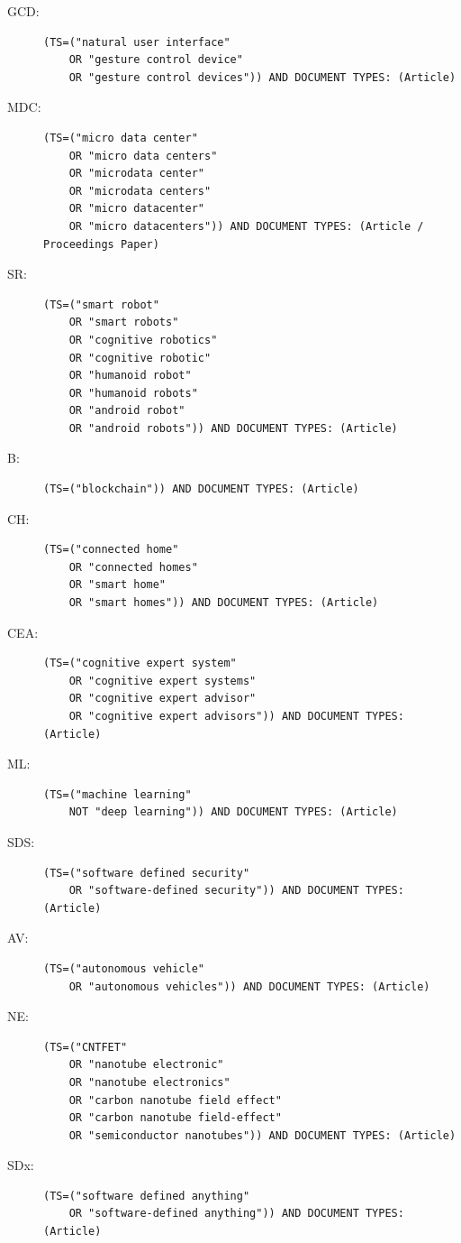 \begin{description}
	\item[GCD:] \begin{verbatim}(TS=("natural user interface"
	OR "gesture control device"
	OR "gesture control devices")) AND DOCUMENT TYPES: (Article)\end{verbatim}
	\item[MDC:] \begin{verbatim}(TS=("micro data center"
	OR "micro data centers"
	OR "microdata center"
	OR "microdata centers"
	OR "micro datacenter"
	OR "micro datacenters")) AND DOCUMENT TYPES: (Article / Proceedings Paper)\end{verbatim}
	\item[SR:] \begin{verbatim}(TS=("smart robot"
	OR "smart robots"
	OR "cognitive robotics"
	OR "cognitive robotic"
	OR "humanoid robot"
	OR "humanoid robots"
	OR "android robot"
	OR "android robots")) AND DOCUMENT TYPES: (Article) \end{verbatim}
	\item[B:] \begin{verbatim}(TS=("blockchain")) AND DOCUMENT TYPES: (Article)\end{verbatim}
	\item[CH:] \begin{verbatim}(TS=("connected home"
	OR "connected homes"
	OR "smart home"
	OR "smart homes")) AND DOCUMENT TYPES: (Article)\end{verbatim}
	\item[CEA:] \begin{verbatim}(TS=("cognitive expert system"
	OR "cognitive expert systems"
	OR "cognitive expert advisor"
	OR "cognitive expert advisors")) AND DOCUMENT TYPES: (Article)\end{verbatim}
	\item[ML:] \begin{verbatim}(TS=("machine learning"
	NOT "deep learning")) AND DOCUMENT TYPES: (Article)\end{verbatim}
	\item[SDS:] \begin{verbatim}(TS=("software defined security"
	OR "software-defined security")) AND DOCUMENT TYPES: (Article)\end{verbatim}
	\item[AV:] \begin{verbatim}(TS=("autonomous vehicle"
	OR "autonomous vehicles")) AND DOCUMENT TYPES: (Article)\end{verbatim}
	\item[NE:] \begin{verbatim}(TS=("CNTFET"
	OR "nanotube electronic"
	OR "nanotube electronics"
	OR "carbon nanotube field effect"
	OR "carbon nanotube field-effect"
	OR "semiconductor nanotubes")) AND DOCUMENT TYPES: (Article)
	\end{verbatim}
	\item[SDx:] \begin{verbatim}(TS=("software defined anything"
	OR "software-defined anything")) AND DOCUMENT TYPES: (Article)\end{verbatim}
\end{description}


